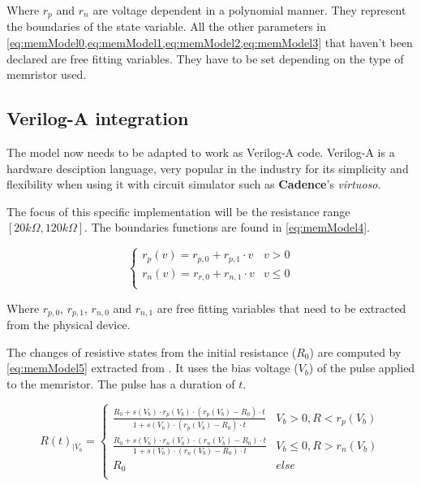 Where $r_p$ and $r_n$ are voltage dependent in a polynomial manner. They represent the boundaries of the state variable. All the other parameters in \cref{eq:memModel0,eq:memModel1,eq:memModel2,eq:memModel3} that haven't been declared are free fitting variables. They have to be set depending on the type of memristor used.

\subsection{Verilog-A integration}

The model now needs to be adapted to work as Verilog-A code.
Verilog-A is a hardware desciption language, very popular in the industry for its simplicity and flexibility when using it with circuit simulator such as \textbf{Cadence}'s \textit{virtuoso}.

The focus of this specific implementation will be the resistance range $[20k\Omega, 120k\Omega]$. The boundaries functions are found in \cref{eq:memModel4}.

\begin{equation}\label{eq:memModel4}
  \begin{cases}
    r_p(v)= r_{p,0} + r_{p,1}\cdot v& v>0\\
    r_n(v)= r_{r,0} + r_{n,1}\cdot v& v\le 0\\
  \end{cases}
\end{equation}

Where $r_{p,0}$, $r_{p,1}$, $r_{n,0}$ and $r_{n,1}$ are free fitting variables that need to be extracted from the physical device.

The changes of resistive states from the initial resistance ($R_0$) are computed by \cref{eq:memModel5} extracted from \cite{memCadenceModel}. It uses the bias voltage ($V_b$) of the pulse applied to the memristor. The pulse has a duration of $t$.

\begin{equation}\label{eq:memModel5}
  R(t)_{|V_b} =
  \begin{cases}
    \frac{R_0+s(V_b)\cdot r_p(V_b)\cdot(r_p(V_b)-R_0)\cdot t}{1+s(V_b)\cdot (r_p(V_b)-R_0)\cdot t} & V_b>0, R<r_p(V_b)\\
    \frac{R_0+s(V_b)\cdot r_n(V_b)\cdot(r_n(V_b)-R_0)\cdot t}{1+s(V_b)\cdot (r_n(V_b)-R_0)\cdot t} & V_b\le 0, R>r_n(V_b)\\
    R_0 & else\\
  \end{cases}
\end{equation}

